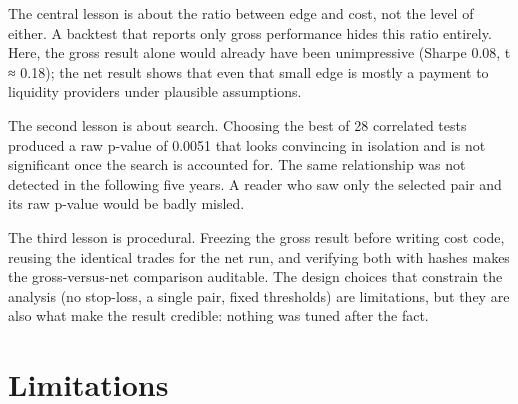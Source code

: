 \documentclass[11pt]{article}
\begin{document}
The central lesson is about the ratio between edge and cost, not the level
of either. A backtest that reports only gross performance hides this ratio
entirely. Here, the gross result alone would already have been
unimpressive (Sharpe 0.08, t ≈ 0.18); the net result shows that even that
small edge is mostly a payment to liquidity providers under plausible
assumptions.

The second lesson is about search. Choosing the best of 28 correlated
tests produced a raw p-value of 0.0051 that looks convincing in isolation
and is not significant once the search is accounted for. The same
relationship was not detected in the following five years. A reader who
saw only the selected pair and its raw p-value would be badly misled.

The third lesson is procedural. Freezing the gross result before writing
cost code, reusing the identical trades for the net run, and verifying
both with hashes makes the gross-versus-net comparison auditable. The
design choices that constrain the analysis (no stop-loss, a single pair,
fixed thresholds) are limitations, but they are also what make the result
credible: nothing was tuned after the fact.

\hypertarget{limitations}{%
\section{Limitations}\label{limitations}}
\end{document}
